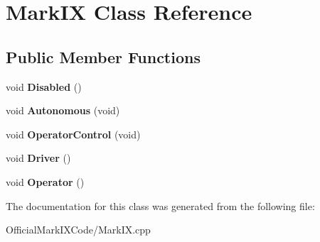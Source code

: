 \hypertarget{class_mark_i_x}{\section{Mark\-I\-X Class Reference}
\label{class_mark_i_x}
}
\subsection*{Public Member Functions}
\begin{DoxyCompactItemize}
\item 
\hypertarget{class_mark_i_x_adca4ea1bab73e885b019e8cf1a5707fe}{void {\bfseries Disabled} ()}\label{class_mark_i_x_adca4ea1bab73e885b019e8cf1a5707fe}

\item 
\hypertarget{class_mark_i_x_aea97f16722f64241e523e413011bd814}{void {\bfseries Autonomous} (void)}\label{class_mark_i_x_aea97f16722f64241e523e413011bd814}

\item 
\hypertarget{class_mark_i_x_a8ddc43e1aab8dac7ca737f929507e22b}{void {\bfseries Operator\-Control} (void)}\label{class_mark_i_x_a8ddc43e1aab8dac7ca737f929507e22b}

\item 
\hypertarget{class_mark_i_x_afc1e96c6885d68a2a2eca02fe3e29de0}{void {\bfseries Driver} ()}\label{class_mark_i_x_afc1e96c6885d68a2a2eca02fe3e29de0}

\item 
\hypertarget{class_mark_i_x_aaaebc36ed027d8bc5f0a6f655be57879}{void {\bfseries Operator} ()}\label{class_mark_i_x_aaaebc36ed027d8bc5f0a6f655be57879}

\end{DoxyCompactItemize}


The documentation for this class was generated from the following file\-:\begin{DoxyCompactItemize}
\item 
Official\-Mark\-I\-X\-Code/Mark\-I\-X.\-cpp\end{DoxyCompactItemize}
